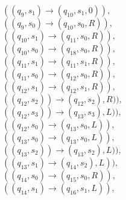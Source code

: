 \documentclass{article} %
\begin{document}
\begin{center}
\begin{varwidth}{\textwidth}
\begin{tasks}[label={},label-width={1cm}]
                $((q_{9}, s_{1}) \to (q_{10}, s_{1}, 0)),$\\
                $((q_{9}, s_{0}) \to (q_{10}, s_{0}, R)),$\\
                $((q_{10}, s_{1}) \to (q_{11}, s_{0}, R)),$\\
                $((q_{10}, s_{0}) \to (q_{18}, s_{0}, R)),$\\
                $((q_{11}, s_{1}) \to (q_{11}, s_{1}, R)),$\\
                $((q_{11}, s_{0}) \to (q_{12}, s_{0}, R)),$\\
                $((q_{12}, s_{1}) \to (q_{12}, s_{1}, R)),$\\
                $((q_{12}, s_{2})) \to (q_{12}, s_{2}), R)),$\\
                $((q_{12}, s_{3})) \to (q_{13}, s_{3}), L)),$\\
                $((q_{12}, s_{0}) \to (q_{13}, s_{0}, L)),$\\
                $((q_{13}, s_{0}) \to (q_{13}, s_{0}, L)),$\\
                $((q_{13}, s_{2})) \to (q_{13}, s_{2}), L)),$\\
                $((q_{13}, s_{1}) \to (q_{14}, s_{2}), L)),$\\
                $((q_{14}, s_{0}) \to (q_{15}, s_{0}, R)),$\\
                $((q_{14}, s_{1}) \to (q_{16}, s_{1}, L)),$\\


\end{tasks}
\end{varwidth}
\end{center}
\end{document}
